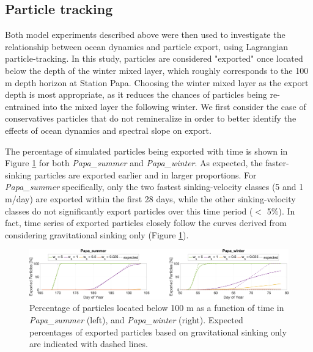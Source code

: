 \documentclass[draft,linenumbers]{agujournal2018}
\begin{document}
\subsection{Particle tracking}

Both model experiments described above were then used to investigate the relationship between ocean dynamics and particle export, using Lagrangian particle-tracking. In this study, particles are considered "exported" once located below the depth of the winter mixed layer, which roughly corresponds to the 100 m depth horizon at Station Papa. Choosing the winter mixed layer as the export depth is most appropriate, as it reduces the chances of particles being re-entrained into the mixed layer the following winter. We first consider the case of conservatives particles that do not remineralize in order to better identify the effects of ocean dynamics and spectral slope on export.

The percentage of simulated particles being exported with time is shown in Figure \ref{fig: particle_export} for both \textit{Papa\_summer} and \textit{Papa\_winter}. As expected, the faster-sinking particles are exported earlier and in larger proportions. For \textit{Papa\_summer} specifically, only the two fastest sinking-velocity classes (5 and 1 m/day) are exported within the first 28 days, while the other sinking-velocity classes do not significantly export particles over this time period ($<$ 5\%). In fact, time series of exported particles closely follow the curves derived from considering gravitational sinking only (Figure \ref{fig: particle_export}).

\begin{figure}[ht]
	\centering
	\includegraphics[width = 1\linewidth]{figures/Fig6_particle_export}
	\caption{Percentage of particles located below 100 m as a function of time in \textit{Papa\_summer} (left), and \textit{Papa\_winter} (right). Expected percentages of exported particles based on gravitational sinking only are indicated with dashed lines.}
	\label{fig: particle_export}
\end{figure}
\end{document}
